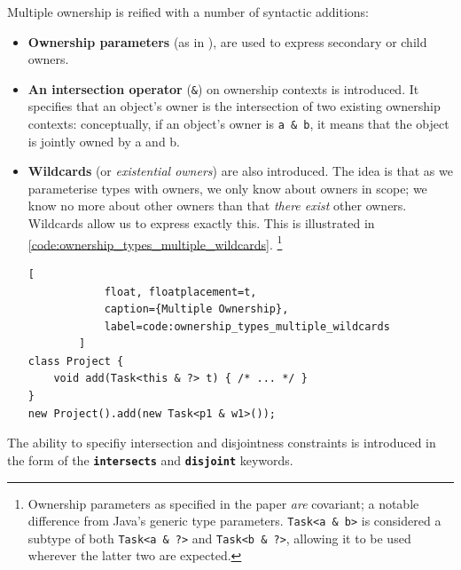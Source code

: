 \documentclass{acm_proc_article-sp}
\begin{document}
Multiple ownership is reified with a number of syntactic additions:

\begin{itemize}

    \item \textbf{Ownership parameters} (as in \cite{boyapati04safejava}), are
        used to express secondary or child owners.

    \item \textbf{An intersection operator} (\lstinline|&|) on ownership
        contexts is introduced. It specifies that an object's owner is the
        intersection of two existing ownership contexts: conceptually, if an
        object's owner is \lstinline|a & b|, it means that the object is jointly
        owned by a and b.

    \item \textbf{Wildcards} (or \textit{existential owners}) are also
        introduced. The idea is that as we parameterise types with owners, we
        only know about owners in scope; we know no more about other owners than
        that \textit{there exist} other owners. Wildcards allow us to express
        exactly this. This is illustrated in
        \cref{code:ownership_types_multiple_wildcards}. \footnote{Ownership
        parameters as specified in the paper \textit{are} covariant; a
        notable difference from Java's generic type parameters.
        \lstinline|Task<a & b>| is considered a subtype of both
        \lstinline|Task<a & ?>| and \lstinline|Task<b & ?>|, allowing it to be
        used wherever the latter two are expected.}

        \begin{lstlisting}[
            float, floatplacement=t,
            caption={Multiple Ownership},
            label=code:ownership_types_multiple_wildcards
        ]
class Project {
	void add(Task<this & ?> t) { /* ... */ }
}
new Project().add(new Task<p1 & w1>());
        \end{lstlisting}

\end{itemize}

The ability to specifiy intersection and disjointness constraints is
introduced in the form of the \textbf{\lstinline|intersects|} and
\textbf{\lstinline|disjoint|} keywords.
\end{document}
